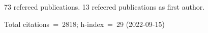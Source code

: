 73 refereed publications. 13 refeered publications as first author.

Total citations~=~2818; h-index~=~29 (2022-09-15)